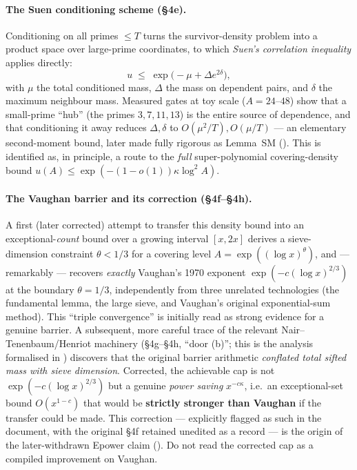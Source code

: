 \documentclass[11pt]{article}
\theoremstyle{plain}
\theoremstyle{definition}
\theoremstyle{remark}
\renewcommand{\_}{\textunderscore\allowbreak}
\begin{document}
\paragraph{The Suen conditioning scheme (\S4e).}
Conditioning on all primes $\le T$ turns the survivor-density problem into a product space over
large-prime coordinates, to which \emph{Suen's correlation inequality} \cite{Suen1990,Janson1990}
applies directly:
\[
u \;\le\; \exp\!\bigl(-\mu+\Delta e^{2\delta}\bigr),
\]
with $\mu$ the total conditioned mass, $\Delta$ the mass on dependent pairs, and $\delta$ the
maximum neighbour mass. Measured gates at toy scale ($A=24$--$48$) show that a small-prime
``hub'' (the primes $3,7,11,13$) is the entire source of dependence, and that conditioning it
away reduces $\Delta,\delta$ to $O(\mu^2/T),O(\mu/T)$ — an elementary second-moment bound, later
made fully rigorous as Lemma~SM (). This is identified as, in principle, a
route to the \emph{full} super-polynomial covering-density bound $u(A)\le\exp(-(1-o(1))\kappa\log^2A)$.

\paragraph{The Vaughan barrier and its correction (\S4f--\S4h).}
A first (later corrected) attempt to transfer this density bound into an exceptional-\emph{count}
bound over a growing interval $[x,2x]$ derives a sieve-dimension constraint
$\theta<1/3$ for a covering level $A=\exp((\log x)^\theta)$, and — remarkably — recovers
\emph{exactly} Vaughan's 1970 exponent $\exp(-c(\log x)^{2/3})$ at the boundary $\theta=1/3$,
independently from three unrelated technologies (the fundamental lemma, the large sieve, and
Vaughan's original exponential-sum method). This ``triple convergence'' is initially read as
strong evidence for a genuine barrier. A subsequent, more careful trace of the relevant Nair--
Tenenbaum/Henriot machinery (\S4g--\S4h, ``door (b)''; this is the analysis formalised in
) discovers that the original barrier arithmetic \emph{conflated total
sifted mass with sieve dimension}. Corrected, the achievable cap is not
$\exp(-c(\log x)^{2/3})$ but a genuine \emph{power saving} $x^{-c\kappa}$, i.e.\ an
exceptional-set bound $O(x^{1-c})$ that would be \textbf{strictly stronger than Vaughan} if
the transfer could be made. This
correction — explicitly flagged as such in the document, with the original \S4f retained
unedited as a record — is the origin of the later-withdrawn E\_power claim
(). Do not read the corrected cap as a compiled improvement on Vaughan.
\end{document}
